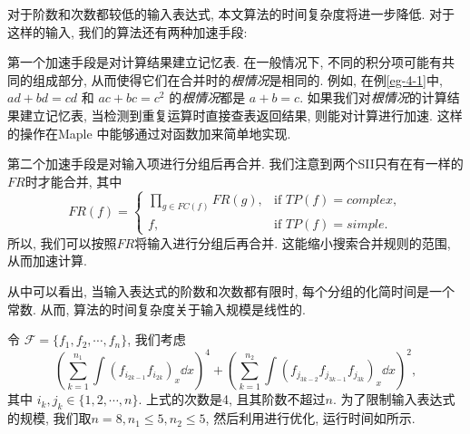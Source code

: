 对于阶数和次数都较低的输入表达式, 本文算法的时间复杂度将进一步降低. 对于这样的输入, 我们的算法还有两种加速手段: 
\begin{asparaenum}[(I)]
\item 第一个加速手段是对计算结果建立记忆表. 在一般情况下, 不同的积分项可能有共同的组成部分, 从而使得它们在合并时的\emph{根情况}是相同的. 例如, 在例\ref{eg-4-1}中, $ad+bd=cd$ 和 $ac+bc=c^2$ 的\emph{根情况}都是 $a+b=c$. 如果我们对\emph{根情况}的计算结果建立记忆表, 当检测到重复运算时直接查表返回结果, 则能对计算进行加速. 这样的操作在Maple 中能够通过对函数加来简单地实现.
\item 第二个加速手段是对输入项进行分组后再合并. 我们注意到两个SII只有在有一样的$FR$时才能合并, 其中\begin{equation}    
FR(f)=\left\{
\begin{array}{cl}
\prod\limits_{g\in FC(f)}{FR(g)}, &\text{if }TP(f)=complex,\\ 
f,           &\text{if }TP(f)=simple.
\end{array}
\right.
\end{equation} 
所以, 我们可以按照$FR$将输入进行分组后再合并. 这能缩小搜索合并规则的范围, 从而加速计算. 
\end{asparaenum}

从中可以看出, 当输入表达式的阶数和次数都有限时, 每个分组的化简时间是一个常数. 从而, 算法的时间复杂度关于输入规模是线性的. 

令 $\mathcal F=\{f_1,f_2,\cdots,f_n\}$, 我们考虑
\begin{equation}
\left(\sum\limits_{k=1}^{n_1}{\int\!{(f_{i_{2k-1}}f_{i_{2k}})_x\dd x}}\right)^4+\left(\sum\limits_{k=1}^{n_2}{\int\!{(f_{j_{3k-2}}f_{j_{3k-1}}f_{j_{3k}})_x\dd x}}\right)^2,
\label{construct}
\end{equation}
其中 $i_k,j_k \in \{1,2,\cdots,n\}$. 上式的次数是4, 且其阶数不超过$n$. 为了限制输入表达式的规模, 我们取$n=8,n_1\le 5,n_2\le 5$, 然后利用进行优化, 运行时间如所示.  

